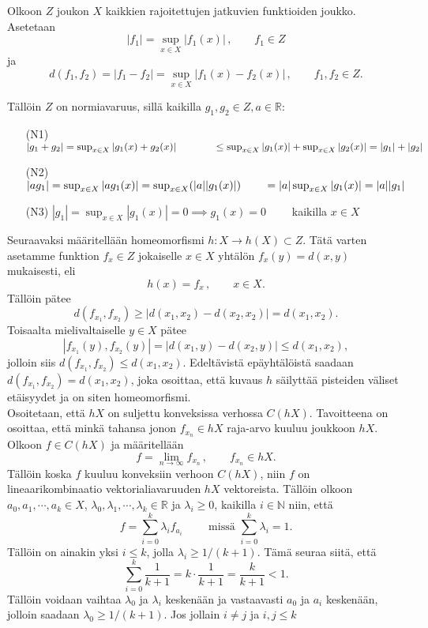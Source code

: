 \documentclass[12pt,a4paper,reqno]{amsart}
\newcommand{\R}{\mathbb{R}}
\newcommand{\N}{\mathbb{N}}
\begin{document}
Olkoon $Z$ joukon $X$ kaikkien rajoitettujen jatkuvien funktioiden joukko. Asetetaan
$$|f_1|=\sup_{x\in X} |f_1(x)| \, , \qquad f_1\in Z$$
ja
$$d(f_1,f_2)=|f_1-f_2| = \sup_{x\in X} |f_1 (x)-f_2 (x)| \, , \qquad f_1, f_2 \in Z .$$

Tällöin $Z$ on normiavaruus, sillä kaikilla $g_1,g_2\in Z, a\in \R$:
\begin{itemize}
\item[(N1)] $|g_1+g_2|=\sup_{x\in X} |g_1(x)+g_2(x)|\\
\phantom{|g_1+g_2|} \leq \sup_{x\in X} |g_1(x)|+\sup_{x\in X} |g_2(x)|=|g_1|+|g_2|$
\item[(N2)] $|ag_1|=\sup_{x\in X} |ag_1(x)|=\sup_{x\in X} (|a||g_1(x)|)\\
\phantom{|a_{1ag}} =|a|\sup_{x\in X} |g_1(x)|=|a||g_1|$
\item[(N3)] $|g_1|=\sup_{x\in X} |g_1(x)|=0\implies g_1(x)=0\qquad$ kaikilla $ x\in X$
\end{itemize}
Seuraavaksi määritellään homeomorfismi $h\colon X\rightarrow h(X)\subset Z$. Tätä varten asetamme funktion $f_x\in Z$ jokaiselle $x\in X$ yhtälön $f_x (y)=d(x,y)$ mukaisesti, eli
$$h(x)=f_x\, ,\qquad x\in X. $$ 
Tällöin pätee 
$$d(f_{x_1} ,f_{x_2} ) \geq |d(x_1 , x_2 )-d(x_2 , x_2 )|=d(x_1 ,x_2 ).$$ 
Toisaalta mielivaltaiselle $y\in X$ pätee
$$|f_{x_1} (y), f_{x_2} (y)|=|d(x_1 ,y )-d(x_2 ,y)|\leq d(x_1 , x_2 ),$$
jolloin siis $d(f_{x_1},f_{x_2})\leq d(x_1 , x_2 )$. Edeltävistä epäyhtälöistä saadaan $d(f_{x_1},f_{x_2})= d(x_1 , x_2 )$, joka osoittaa, että kuvaus $h$ säilyttää pisteiden väliset etäisyydet ja on siten homeomorfismi.\\
Osoitetaan, että $hX$ on suljettu konveksissa verhossa $C(hX)$. Tavoitteena on osoittaa, että minkä tahansa jonon $f_{x_n}\in hX$ raja-arvo kuuluu joukkoon $ hX$. Olkoon $f\in C(hX)$ ja määritellään 
$$f=\lim_{n\rightarrow\infty} f_{x_n} \, , \qquad f_{x_n}\in hX.$$ 
Tällöin koska $f$ kuuluu konveksiin verhoon $C(hX)$, niin $f$ on lineaarikombinaatio vektorialiavaruuden $hX$ vektoreista. Tällöin olkoon $a_0,a_1,\cdots, a_k \in X$, $\lambda_0,\lambda_1,\cdots, \lambda_k \in \R$ ja $\lambda_i\geq 0$, kaikilla $ i\in\N$ niin, että $$f=\sum_{i=0}^k \lambda_i f_{a_i}\qquad \text{ missä } \sum_{i=0}^k \lambda_i =1.$$
Tällöin on ainakin yksi $i\leq k$, jolla $\lambda_i \geq 1/(k+1)$. Tämä seuraa siitä, että $$\sum_{i=0}^k \frac{1}{k+1}=k\cdot \dfrac{1}{k+1}=\dfrac{k}{k+1}<1 .$$ Tällöin voidaan vaihtaa $\lambda_0$ ja $\lambda_i$ keskenään ja vastaavasti $a_0$ ja $a_i$ keskenään, jolloin saadaan $\lambda_0\geq 1/(k+1)$. Jos jollain $i\neq j$ ja $i,j\leq k$ %
\end{document}
